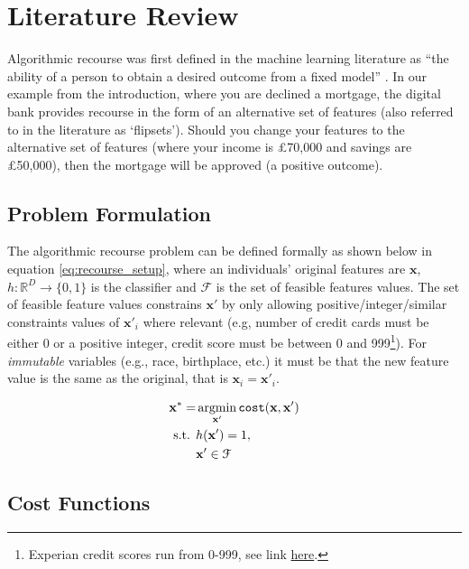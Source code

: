 \chapter{Literature Review} \label{chapter:lit_review}

Algorithmic recourse was first defined in the machine learning literature as ``the ability of a person to obtain a desired outcome from a fixed model'' \citep{ustunActionableRecourseLinear2019}. In our example from the introduction, where you are declined a mortgage, the digital bank provides recourse in the form of an alternative set of features (also referred to in the literature as `flipsets'). Should you change your features to the alternative set of features (where your income is £70,000 and savings are £50,000), then the mortgage will be approved (a positive outcome).


\section{Problem Formulation}
The algorithmic recourse problem can be defined formally as shown below in equation \ref{eq:recourse_setup}, where an individuals' original features are $\mathbf{x}$, $h: \mathbb{R}^D \to \{0,1\}$ is the classifier and $\mathcal{F}$ is the set of feasible features values. The set of feasible feature values constrains $\mathbf{x}'$ by only allowing positive/integer/similar constraints values of $\mathbf{x}'_i$ where relevant (e.g, number of credit cards must be either 0 or a positive integer, credit score must be between 0 and 999\footnote{Experian credit scores run from 0-999, see link \href{https://www.experian.co.uk/consumer/experian-credit-score.html}{here}.}). For \textit{immutable} variables (e.g., race, birthplace, etc.) it must be that the new feature value is the same as the original, that is $\mathbf{x}_i=\mathbf{x}'_i$.

\begin{align} \label{eq:recourse_setup}
	\mathbf{x}^* = & \operatorname*{argmin}_{\mathbf{x}'}  \operatorname*{\texttt{cost}}(\mathbf{x}, \mathbf{x}') \\ \nonumber
	\text{s.t. } & h(\mathbf{x}') = 1, \\ \nonumber
	& \mathbf{x}' \in \mathcal{F}
\end{align}

\section{Cost Functions} \label{section:cost_functions_lit_review}

